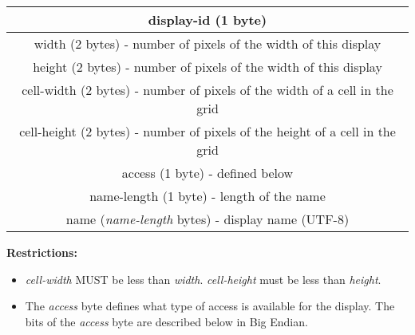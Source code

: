\documentclass{article}
\begin{document}
    \begin{center}
        \begin{tabular}{|c|}
            \hline
            display-id (1 byte)                                                          \\
            \hline
            width (2 bytes) - number of pixels of the width of this display              \\
            \hline
            height (2 bytes) - number of pixels of the width of this display             \\
            \hline
            cell-width (2 bytes) - number of pixels of the width of a cell in the grid   \\
            \hline
            cell-height (2 bytes) - number of pixels of the height of a cell in the grid \\
            \hline
            access (1 byte) - defined below                                              \\
            \hline
            name-length (1 byte) -  length of the name                                     \\
            \hline
            name (\emph{name-length} bytes) - display name (UTF-8)                       \\
            \hline
        \end{tabular}
    \end{center}

    \textbf{Restrictions:}

    \begin{itemize}
        \item \emph{cell-width} MUST be less than \emph{width}. \emph{cell-height} must be less than \emph{height}.\\ %
        \item The \emph{access} byte defines what type of access is available for the display. The bits of the \emph{access} byte are described below in Big Endian.
    \end{itemize}
\end{document}
